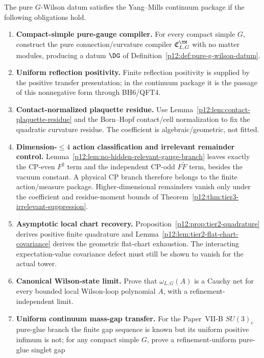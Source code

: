 \documentclass[12pt,a4paper]{article}
\begin{document}
\begin{definition}
\label{p12:def:ym-continuum-obligations}
The pure \(G\)-Wilson datum satisfies the Yang--Mills continuum package if the following obligations hold.
\begin{enumerate}[label=\textnormal{(BH\arabic*)}, leftmargin=3.1em]
\item \textbf{Compact-simple pure-gauge compiler.}  For every compact simple \(G\), construct the pure connection/curvature compiler \(\mathfrak C_{L,G}^{\YM}\) with no matter modules, producing a datum \(\DG\) of Definition~\ref{p12:def:pure-g-wilson-datum}.
\item \textbf{Uniform reflection positivity.}  Finite reflection positivity is supplied by the positive transfer presentation; in the continuum package it is the passage of this nonnegative form through BH6/QFT4.
\item \textbf{Contact-normalized plaquette residue.}  Use Lemma~\ref{p12:lem:contact-plaquette-residue} and the Born--Hopf contact/cell normalization to fix the quadratic curvature residue.  The coefficient is algebraic/geometric, not fitted.
\item \textbf{Dimension-\(\le4\) action classification and irrelevant remainder control.}  Lemma~\ref{p12:lem:no-hidden-relevant-gauge-branch} leaves exactly the CP-even \(F^2\) term and the independent CP-odd \(F\widetilde F\) term, besides the vacuum constant.  A physical CP branch therefore belongs to the finite action/measure package.  Higher-dimensional remainders vanish only under the coefficient and residue-moment bounds of Theorem~\ref{p12:thm:tier3-irrelevant-suppression}.
\item \textbf{Asymptotic local chart recovery.}  Proposition~\ref{p12:prop:tier2-quadrature} derives positive finite quadrature and Lemma~\ref{p12:lem:tier2-flat-chart-covariance} derives the geometric flat-chart exhaustion.  The interacting expectation-value covariance defect must still be shown to vanish for the actual tower.
\item \textbf{Canonical Wilson-state limit.}  Prove that \(\omega_{L,G}(A)\) is a Cauchy net for every bounded local Wilson-loop polynomial \(A\), with a refinement-independent limit.
\item \textbf{Uniform continuum mass-gap transfer.}  For the Paper~VII-B \(SU(3)_c\) pure-glue branch the finite gap sequence is known but its uniform positive infimum is not; for any compact simple \(G\), prove a refinement-uniform pure-glue singlet gap

\end{enumerate}
\end{definition}
\end{document}
